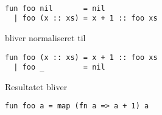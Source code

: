 \begin{example}\
\begin{verbatim}
fun foo nil       = nil
  | foo (x :: xs) = x + 1 :: foo xs
\end{verbatim}

bliver normaliseret til

\begin{verbatim}
fun foo (x :: xs) = x + 1 :: foo xs
  | foo _         = nil
\end{verbatim}

Resultatet bliver

\begin{verbatim}
fun foo a = map (fn a => a + 1) a
\end{verbatim}


  


    
    
    
        
        
      
        

\end{example}
